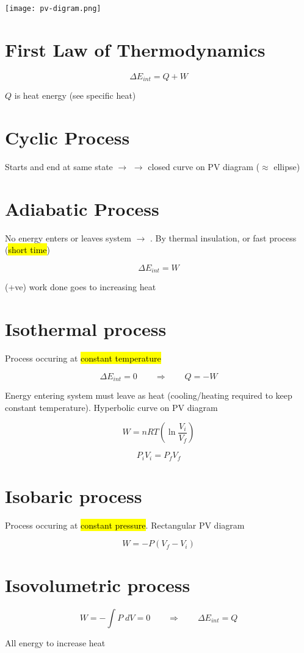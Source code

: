 \documentclass[12pt]{article}
\begin{document}
\begin{spacing}{1.5}
\texttt{[image: pv-digram.png]}

\section{First Law of Thermodynamics}

$$\Delta E_{int} = Q + W$$

$Q$ is heat energy (see specific heat)

\section{Cyclic Process}

Starts and end at same state $\rightarrow$  $\rightarrow$ closed curve on PV diagram ($\approx$ ellipse)

\section{Adiabatic Process}

No energy enters or leaves system $\rightarrow$ . By thermal insulation, or fast process (\hl{short time})

$$\Delta E_{int} = W$$

(+ve) work done goes to increasing heat

\section{Isothermal process}

Process occuring at \hl{constant temperature}

$$\Delta E_{int} = 0 \qquad \Rightarrow \qquad Q = -W$$

Energy entering system must leave as heat (cooling/heating required to keep constant temperature). Hyperbolic curve on PV diagram

$$W = nRT (\ln{\frac{V_i}{V_f}})$$

$$P_i V_i = P_f V_f$$

\section{Isobaric process}

Process occuring at \hl{constant pressure}. Rectangular PV diagram

$$W = -P (V_f - V_i)$$

\section{Isovolumetric process}

$$W = -\int P \; dV = 0 \qquad \Rightarrow \qquad \Delta E_{int} = Q$$

All energy to increase heat


\end{spacing}
\end{document}
